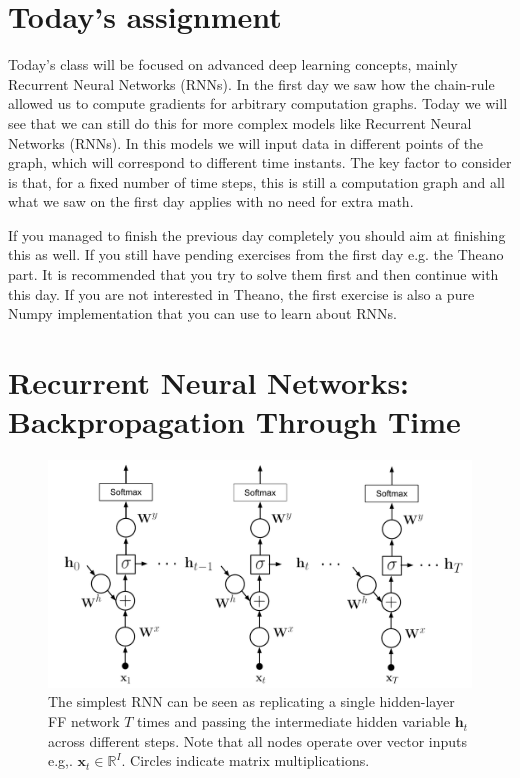 \section{Today's assignment}
Today's class will be focused on advanced deep learning concepts, mainly
Recurrent Neural Networks (RNNs). In the first day we saw how the chain-rule
allowed us to compute gradients for arbitrary computation graphs. Today we will
see that we can still do this for more complex models like Recurrent Neural
Networks (RNNs). In this models we will input data in different points of the
graph, which will correspond to different time instants. The key factor to
consider is that, for a fixed number of time steps, this is still a computation
graph and all what we saw on the first day applies with no need for extra math.

If you managed to finish the previous day completely you should aim at finishing
this as well. If you still have pending exercises from the first day e.g. the
Theano part. It is recommended that you try to solve them first and then
continue with this day. If you are not interested in Theano, the first exercise is
also a pure Numpy implementation that you can use to learn about RNNs.

\section{Recurrent Neural Networks: Backpropagation Through Time}

\begin{figure}[!h]
\centering
\includegraphics[scale=0.6]{figs/deep_learning/RNN.pdf}
\caption{The simplest RNN can be seen as replicating a single hidden-layer FF
network $T$ times and passing the intermediate hidden variable $\mathbf{h}_t$
across different steps. Note that all nodes operate over vector inputs e.g,.
$\mathbf{x}_t \in \mathbb{R}^I$. Circles indicate matrix multiplications.}
\label{fig:RNN}
\end{figure}

